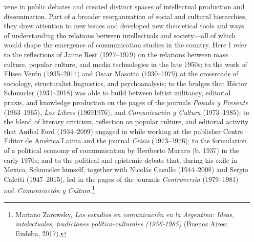 \documentclass{tufte-handout}
\begin{document}
\noindent vene in public debates
and created distinct spaces of intellectual production and
dissemination. Part of a broader reorganization of social and cultural
hierarchies, they drew attention to new issues and developed new
theoretical tools and ways of understanding the relations between
intellectuals and society---all of which would shape the emergence of
communication studies in the country. Here I refer to the reflections of
Jaime Rest (1927--1979) on the relations between mass culture, popular
culture, and media technologies in the late 1950s; to the work of Eliseo
Verón (1935­--2014) and Oscar Masotta (1930--1979) at the crossroads of
sociology, structuralist linguistics, and psychoanalysis; to the bridges
that Héctor Schmucler (1931--2018) was able to build between leftist
militancy, editorial praxis, and knowledge production on the pages of
the journals \emph{Pasado y Presente} (1963--1965), \emph{Los Libros}
(1969­1976), and \emph{Comunicación y Cultura} (1973--1985); to the
blend of literary criticism, reflection on popular culture, and
editorial activity that Aníbal Ford (1934­--2009) engaged in while
working at the publisher Centro Editor de América Latina and the journal
\emph{Crisis} (1973­--1976); to the formulation of a political economy
of communication by Heriberto Muraro (b. 1937) in the early 1970s; and
to the political and epistemic debate that, during his exile in Mexico,
Schmucler himself, together with Nicolás Casullo (1944­--2008) and
Sergio Caletti (1947­--2015), led in the pages of the journals
\emph{Controversia} (1979­­--1981) and \emph{Comunicación y
Cultura}.\footnote{Mariano Zarowsky, \emph{Los estudios en comunicación
  en la Argentina: Ideas, intelectuales, tradiciones político-culturales
  (1956-1985)} (Buenos Aires: Eudeba, 2017).}
\end{document}
